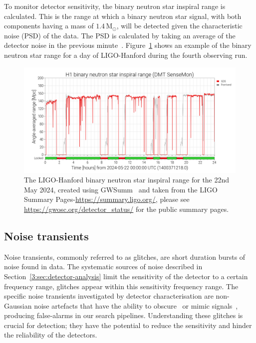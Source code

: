 To monitor detector sensitivity, the binary neutron star inspiral range is calculated. This is the range at which a binary neutron star signal, with both components having a mass of $1.4 \, \text{M}_{\odot}$, will be detected given the characteristic noise (PSD) of the data. The PSD is calculated by taking an average of the detector noise in the previous minute~\cite{range_calculation:2003, ota:2023}. Figure~\ref{3:fig:bns_range} shows an example of the binary neutron star range for a day of LIGO-Hanford during the fourth observing run.
%
\begin{figure}
    \centering
    \includegraphics[width=1\linewidth]{images/3_detector_characterisation/may22_bns_range.png}
    \caption{The LIGO-Hanford binary neutron star inspiral range for the 22nd May 2024, created using GWSumm~\cite{gwsumm:2024} and taken from the LIGO Summary Pages-\href{https://summary.ligo.org/}{https://summary.ligo.org/}, please see \href{https://gwosc.org/detector_status/}{https://gwosc.org/detector\_status/} for the public summary pages.}
    \label{3:fig:bns_range}
\end{figure}
%

\subsection{\label{3:sec:noise-transients}Noise transients}


Noise transients, commonly referred to as glitches, are short duration bursts of noise found in \gwadj data. The systematic sources of noise described in Section~\ref{3:sec:detector-analysis} limit the sensitivity of the detector to a certain frequency range, glitches appear within this sensitivity frequency range. The specific noise transients investigated by detector characterisation are non-Gaussian noise artefacts that have the ability to obscure~\cite{GW170817:2017} or mimic \gwadj signals~\cite{GWMimicking:2010}, producing false-alarms in our \gwadj search pipelines. Understanding these glitches is crucial for \gwadj detection; they have the potential to reduce the sensitivity and hinder the reliability of the detectors.
%
%

